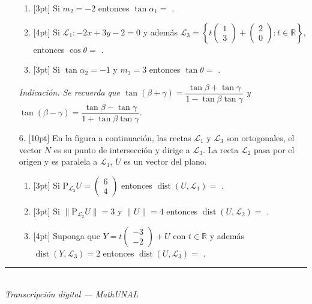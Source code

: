 \documentclass[11pt]{article}
\newcommand{\vect}[2]{\begin{pmatrix}#1\\#2\end{pmatrix}}
\newcommand{\examfooter}{%
  \vfill
  \rule{\linewidth}{0.4pt}\\[1pt]
  {\scriptsize\textit{Transcripción digital --- MathUNAL}\hfill\textcolor{unalblue}{\textbf{\thepage}}}
}
\newcommand{\nota}[1]{{\small\itshape\color{unalblue!70!black} #1}}
\begin{document}
\begin{enumerate}
\begin{enumerate}[label=(\alph*)]
\item{}[3pt] Si $m_2=-2$ entonces $\tan\alpha_1=$ \underline{\hspace{4cm}}.
\item{}[4pt] Si $\mathcal{L}_1: -2x+3y-2=0$ y además $\mathcal{L}_3=\left\{t\vect{1}{3}+\vect{2}{0}: t\in\mathbb{R}\right\}$, entonces $\cos\theta=$ \underline{\hspace{4cm}}.
\item{}[3pt] Si $\tan\alpha_2=-1$ y $m_3=3$ entonces $\tan\theta=$ \underline{\hspace{4cm}}.
\end{enumerate}

\nota{Indicación. Se recuerda que $\tan(\beta+\gamma)=\dfrac{\tan\beta+\tan\gamma}{1-\tan\beta\tan\gamma}$ y $\tan(\beta-\gamma)=\dfrac{\tan\beta-\tan\gamma}{1+\tan\beta\tan\gamma}$.}

\item[6.] [10pt] En la figura a continuación, las rectas $\mathcal{L}_1$ y $\mathcal{L}_3$ son ortogonales, el vector $N$ es su punto de intersección y dirige a $\mathcal{L}_3$. La recta $\mathcal{L}_2$ pasa por el origen y es paralela a $\mathcal{L}_1$, $U$ es un vector del plano.

\begin{center}
\end{center}

\begin{enumerate}[label=(\alph*)]
\item{}[3pt] Si $\mathrm{P}_{\mathcal{L}_3}U=\vect{6}{4}$ entonces $\operatorname{dist}(U,\mathcal{L}_1)=$ \underline{\hspace{4cm}}.
\item{}[3pt] Si $\|\mathrm{P}_{\mathcal{L}_2}U\|=3$ y $\|U\|=4$ entonces $\operatorname{dist}(U,\mathcal{L}_2)=$ \underline{\hspace{4cm}}.
\item{}[4pt] Suponga que $Y=t\vect{-3}{-2}+U$ con $t\in\mathbb{R}$ y además $\operatorname{dist}(Y,\mathcal{L}_3)=2$ entonces $\operatorname{dist}(U,\mathcal{L}_3)=$ \underline{\hspace{4cm}}.
\end{enumerate}

\end{enumerate}

\examfooter
\end{document}
